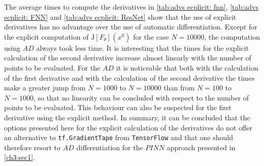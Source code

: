 The average times to compute the derivatives in \cref{tab:advs ecplicit: fnn}, \cref{tab:advs ecplicit: FNN} and \cref{tab:advs ecplicit: ResNet} show that the use of explicit derivatives has no advantage over the use of automatic differentiation. Except for the explicit computation of $\mathrm{J} \left[ F_{\theta} \right]\left(x^0\right)$ for the case $N = 10000$, the computation using $AD$ always took less time. It is interesting that the times for the explicit calculation of the second derivative increase almost linearly with the number of points to be evaluated. For the $AD$ it is noticeable that both with the calculation of the first derivative and with the calculation of the second derivative the times make a greater jump from $N = 1000$ to $N = 10000$ than from $N = 100$ to $N = 1000$, so that no linearity can be concluded with respect to the number of points to be evaluated. This behaviour can also be suspected for the first derivative using the explicit method. In summary, it can be concluded that the options presented here for the explicit calculation of the derivatives do not offer an alternative to \lstinline!tf.GradientTape! from \lstinline!TensorFlow! and that one should therefore resort to $AD$ differentiation for the $PINN$ approach presented in \cref{ch3:sec1}.